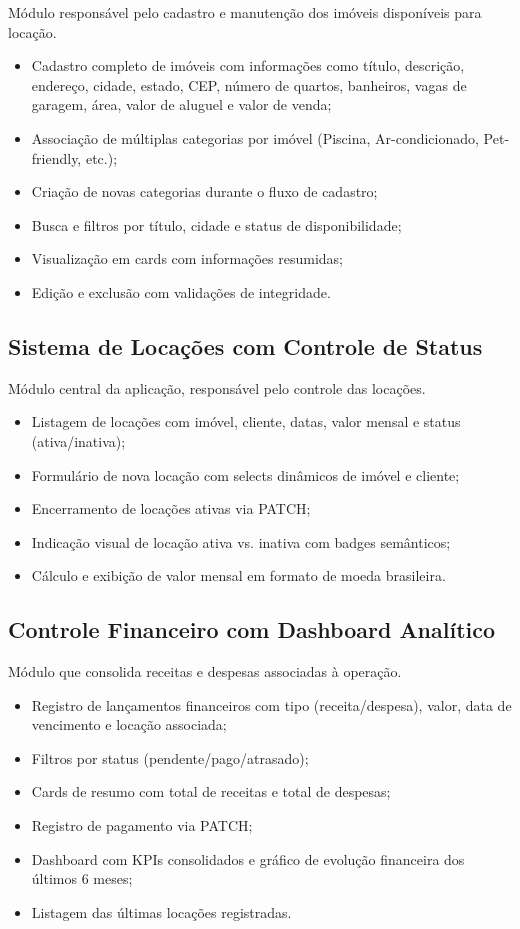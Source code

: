\documentclass[12pt, a4paper]{article}
\begin{document}
Módulo responsável pelo cadastro e manutenção dos imóveis disponíveis para locação.

\begin{itemize}[leftmargin=1.5em]
  \item Cadastro completo de imóveis com informações como título, descrição, endereço, cidade, estado, CEP, número de quartos, banheiros, vagas de garagem, área, valor de aluguel e valor de venda;
  \item Associação de múltiplas categorias por imóvel (Piscina, Ar-condicionado, Pet-friendly, etc.);
  \item Criação de novas categorias durante o fluxo de cadastro;
  \item Busca e filtros por título, cidade e status de disponibilidade;
  \item Visualização em cards com informações resumidas;
  \item Edição e exclusão com validações de integridade.
\end{itemize}

\subsection{Sistema de Locações com Controle de Status}

Módulo central da aplicação, responsável pelo controle das locações.

\begin{itemize}[leftmargin=1.5em]
  \item Listagem de locações com imóvel, cliente, datas, valor mensal e status (ativa/inativa);
  \item Formulário de nova locação com selects dinâmicos de imóvel e cliente;
  \item Encerramento de locações ativas via PATCH;
  \item Indicação visual de locação ativa vs. inativa com badges semânticos;
  \item Cálculo e exibição de valor mensal em formato de moeda brasileira.
\end{itemize}

\subsection{Controle Financeiro com Dashboard Analítico}

Módulo que consolida receitas e despesas associadas à operação.

\begin{itemize}[leftmargin=1.5em]
  \item Registro de lançamentos financeiros com tipo (receita/despesa), valor, data de vencimento e locação associada;
  \item Filtros por status (pendente/pago/atrasado);
  \item Cards de resumo com total de receitas e total de despesas;
  \item Registro de pagamento via PATCH;
  \item Dashboard com KPIs consolidados e gráfico de evolução financeira dos últimos 6 meses;
  \item Listagem das últimas locações registradas.
\end{itemize}
\end{document}
